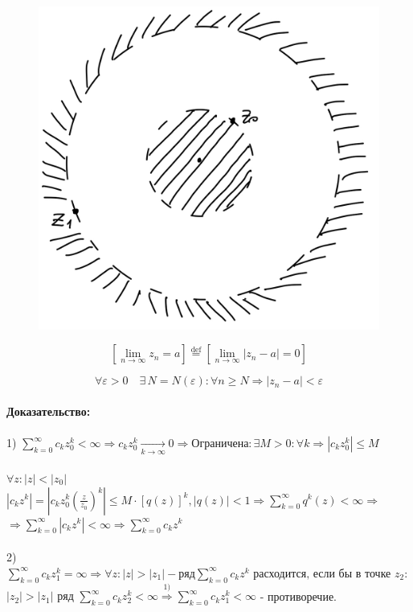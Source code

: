 \documentclass[a4paper,12pt]{article} %
\begin{document}
	\begin{figure}[h!]
		\centering
	\includegraphics[scale = 0.1]{Que_11_pic_1.jpeg}
	\end{figure}
	
$$[\lim\limits_{n \rightarrow \infty} z_n = a]  \stackrel{\text{def}}{=} [ \lim\limits_{n \rightarrow \infty} |z_n - a| = 0]$$

$$\forall \varepsilon > 0 \quad\exists \, N = N (\varepsilon): \forall n \geqslant N \Rightarrow |z_n - a| < \varepsilon $$ \\

\textbf{Доказательство:} \\
\ \\
1) $\sum\limits_{k = 0}^\infty c_k z_0^k < \infty \Rightarrow c_k z_0^k \underset{k \to \infty}{\longrightarrow} 0 \Rightarrow \text{Ограничена:} \,  \exists M > 0: \forall k \Rightarrow |c_k z_0^k| \leqslant M$ \\
\ \\
$ \forall z: |z| < |z_0| $ \\
$ |c_k z^k| = | c_k z_0^k  \left(  \frac{z}{z_0} \right)^k | \leqslant M \cdot \left[ q(z) \right]^k, |q(z)| < 1 \Rightarrow \sum\limits_{k = 0}^\infty q^k(z) < \infty \Rightarrow
$\\
$
 \Rightarrow \sum\limits_{k = 0}^\infty |c_k z^k| < \infty \Rightarrow \sum\limits_{k = 0}^\infty c_k z^k
$\\
\ \\
2) $
\sum\limits_{k = 0}^\infty c_k z_1^k = \infty \Rightarrow \forall z: |z| > |z_1| - \text{ряд} \sum\limits_{k = 0}^\infty c_k z^k \text{ расходится, если бы в точке } z_2: 
$\\
$
|z_2| > |z_1| \text{ ряд } \sum\limits_{k = 0}^\infty c_k z_2^k < \infty \stackrel{1)}{\Rightarrow} \sum\limits_{k = 0}^\infty c_k z_1^k < \infty
$ - противоречие. \\
\end{document}
